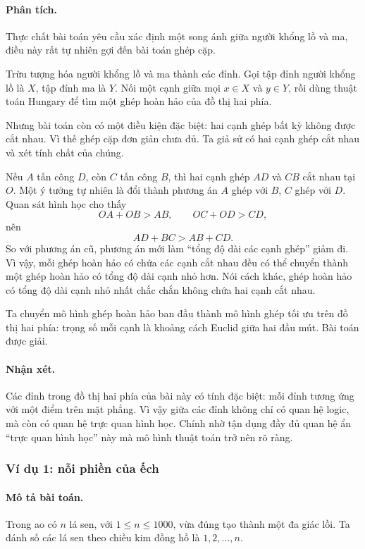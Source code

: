 \documentclass[11pt]{article}
\begin{document}
\paragraph{Phân tích.}
Thực chất bài toán yêu cầu xác định một song ánh giữa người khổng lồ và ma,
điều này rất tự nhiên gợi đến bài toán ghép cặp.

Trừu tượng hóa người khổng lồ và ma thành các đỉnh. Gọi tập đỉnh người khổng
lồ là \(X\), tập đỉnh ma là \(Y\). Nối một cạnh giữa mọi \(x\in X\) và
\(y\in Y\), rồi dùng thuật toán Hungary để tìm một ghép hoàn hảo của đồ thị
hai phía.

Nhưng bài toán còn có một điều kiện đặc biệt: hai cạnh ghép bất kỳ không được
cắt nhau. Vì thế ghép cặp đơn giản chưa đủ. Ta giả sử có hai cạnh ghép cắt
nhau và xét tính chất của chúng.

Nếu \(A\) tấn công \(D\), còn \(C\) tấn công \(B\), thì hai cạnh ghép \(AD\)
và \(CB\) cắt nhau tại \(O\). Một ý tưởng tự nhiên là đổi thành phương án
\(A\) ghép với \(B\), \(C\) ghép với \(D\). Quan sát hình học cho thấy
\[
  OA+OB>AB,\qquad OC+OD>CD,
\]
nên
\[
  AD+BC>AB+CD.
\]
So với phương án cũ, phương án mới làm ``tổng độ dài các cạnh ghép'' giảm đi.
Vì vậy, mỗi ghép hoàn hảo có chứa các cạnh cắt nhau đều có thể chuyển thành
một ghép hoàn hảo có tổng độ dài cạnh nhỏ hơn. Nói cách khác, ghép hoàn hảo
có tổng độ dài cạnh nhỏ nhất chắc chắn không chứa hai cạnh cắt nhau.

Ta chuyển mô hình ghép hoàn hảo ban đầu thành mô hình ghép tối ưu trên đồ thị
hai phía: trọng số mỗi cạnh là khoảng cách Euclid giữa hai đầu mút. Bài toán
được giải.

\paragraph{Nhận xét.}
Các đỉnh trong đồ thị hai phía của bài này có tính đặc biệt: mỗi đỉnh tương
ứng với một điểm trên mặt phẳng. Vì vậy giữa các đỉnh không chỉ có quan hệ
logic, mà còn có quan hệ trực quan hình học. Chính nhờ tận dụng đầy đủ quan hệ
ẩn ``trực quan hình học'' này mà mô hình thuật toán trở nên rõ ràng.

\subsubsection*{Ví dụ 1: nỗi phiền của ếch}

\paragraph{Mô tả bài toán.}
Trong ao có \(n\) lá sen, với \(1\le n\le 1000\), vừa đúng tạo thành một đa
giác lồi. Ta đánh số các lá sen theo chiều kim đồng hồ là
\(1,2,\ldots,n\).
\end{document}
